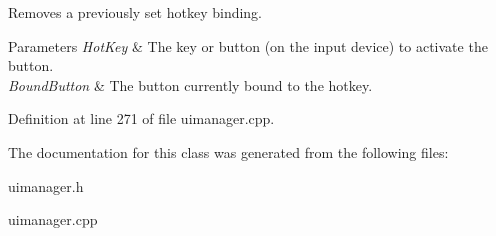 Removes a previously set hotkey binding. 


\begin{DoxyParams}{Parameters}
{\em HotKey} & The key or button (on the input device) to activate the button. \\
\hline
{\em BoundButton} & The button currently bound to the hotkey. \\
\hline
\end{DoxyParams}


Definition at line 271 of file uimanager.cpp.



The documentation for this class was generated from the following files:\begin{DoxyCompactItemize}
\item 
uimanager.h\item 
uimanager.cpp\end{DoxyCompactItemize}

